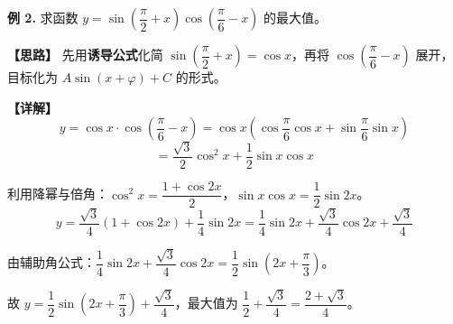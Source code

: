 \documentclass[UTF8,10pt,aspectratio=169]{ctexbeamer}
\begin{document}
	\begin{frame}
		\textbf{例 2.} 求函数 $y = \sin\left(\dfrac{\pi}{2} + x\right)\cos\left(\dfrac{\pi}{6} - x\right)$ 的最大值。
		
		\vspace{0.3cm}
		\textbf{【思路】} 先用\textbf{诱导公式}化简 $\sin(\dfrac{\pi}{2}+x) = \cos x$，再将 $\cos(\dfrac{\pi}{6}-x)$ 展开，目标化为 $A\sin(x+\varphi) + C$ 的形式。
		
		\pause
		\vspace{0.2cm}
		\textbf{【详解】} 
		$$y = \cos x \cdot \cos\left(\dfrac{\pi}{6} - x\right) = \cos x\left(\cos\dfrac{\pi}{6}\cos x + \sin\dfrac{\pi}{6}\sin x\right)$$
		$$= \dfrac{\sqrt{3}}{2}\cos^2 x + \dfrac{1}{2}\sin x\cos x$$
		
		\vspace{0.1cm}
		利用降幂与倍角：$\cos^2 x = \dfrac{1+\cos 2x}{2}$，$\sin x\cos x = \dfrac{1}{2}\sin 2x$。
		$$y = \dfrac{\sqrt{3}}{4}(1+\cos 2x) + \dfrac{1}{4}\sin 2x = \dfrac{1}{4}\sin 2x + \dfrac{\sqrt{3}}{4}\cos 2x + \dfrac{\sqrt{3}}{4}$$
		
		\vspace{0.1cm}
		由辅助角公式：$\dfrac{1}{4}\sin 2x + \dfrac{\sqrt{3}}{4}\cos 2x = \dfrac{1}{2}\sin\left(2x + \dfrac{\pi}{3}\right)$。
		
		\vspace{0.1cm}
		故 $y = \dfrac{1}{2}\sin\left(2x+\dfrac{\pi}{3}\right) + \dfrac{\sqrt{3}}{4}$，最大值为 $\boxed{\dfrac{1}{2} + \dfrac{\sqrt{3}}{4} = \dfrac{2+\sqrt{3}}{4}}$。
	\end{frame}
	
\end{document}
